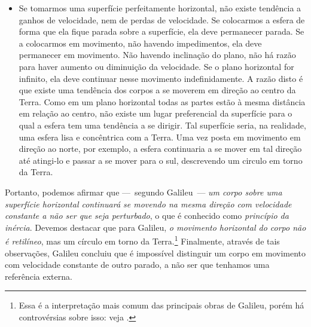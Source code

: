 \begin{itemize}
\begin{marginfigure}[15mm]
\centering
{}
\caption{Um a superfície horizontal infinita é, na verdade, uma esfera perfeitamente lisa.}
\end{marginfigure}
  \item Se tomarmos uma superfície perfeitamente horizontal, não existe tendência a ganhos de velocidade, nem de perdas de velocidade. Se colocarmos a esfera de forma que ela fique parada sobre a superfície, ela deve permanecer parada. Se a colocarmos em movimento, não havendo impedimentos, ela deve permanecer em movimento. Não havendo inclinação do plano, não há razão para haver aumento ou diminuição da velocidade. Se o plano horizontal for infinito, ela deve continuar nesse movimento indefinidamente. A razão disto é que existe uma tendência dos corpos a se moverem em direção ao centro da Terra. Como em um plano horizontal todas as partes estão à mesma distância em relação ao centro, não existe um lugar preferencial da superfície para o qual a esfera tem uma tendência a se dirigir. Tal superfície seria, na realidade, uma esfera lisa e concêntrica com a Terra. Uma vez posta em movimento em direção ao norte, por exemplo, a esfera continuaria a se mover em tal direção até atingi-lo e passar a se mover para o sul, descrevendo um circulo em torno da Terra.
\end{itemize}
%
Portanto, podemos afirmar que ---~segundo Galileu~--- \emph{um corpo sobre uma superfície horizontal continuará se movendo na mesma direção com velocidade constante a não ser que seja perturbado}, o que é conhecido como \emph{princípio da inércia}. Devemos destacar que para Galileu, \emph{o movimento horizontal do corpo não é retilíneo}, mas um círculo em torno da Terra.\footnote[][-3cm]{Essa é a interpretação mais comum das principais obras de Galileu, porém há controvérsias sobre isso: veja .} Finalmente, através de tais observações, Galileu concluiu que é impossível distinguir um corpo em movimento com velocidade constante de outro parado, a não ser que tenhamos uma referência externa.

